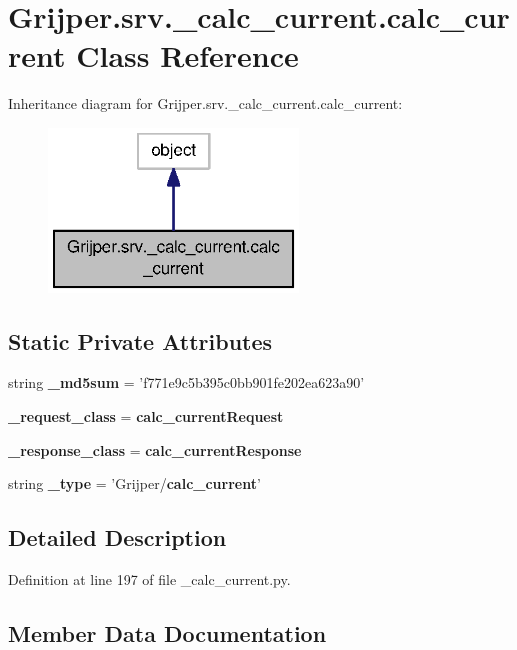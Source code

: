 \section{Grijper.\-srv.\-\_\-calc\-\_\-current.\-calc\-\_\-current Class Reference}
\label{classGrijper_1_1srv_1_1__calc__current_1_1calc__current}


Inheritance diagram for Grijper.\-srv.\-\_\-calc\-\_\-current.\-calc\-\_\-current\-:\nopagebreak
\begin{figure}[H]
\begin{center}
\leavevmode
\includegraphics[width=188pt]{classGrijper_1_1srv_1_1__calc__current_1_1calc__current__inherit__graph}
\end{center}
\end{figure}
\subsection*{Static Private Attributes}
\begin{DoxyCompactItemize}
\item 
string {\bf \-\_\-md5sum} = 'f771e9c5b395c0bb901fe202ea623a90'
\item 
{\bf \-\_\-request\-\_\-class} = {\bf calc\-\_\-current\-Request}
\item 
{\bf \-\_\-response\-\_\-class} = {\bf calc\-\_\-current\-Response}
\item 
string {\bf \-\_\-type} = 'Grijper/{\bf calc\-\_\-current}'
\end{DoxyCompactItemize}


\subsection{Detailed Description}


Definition at line 197 of file \-\_\-calc\-\_\-current.\-py.



\subsection{Member Data Documentation}
